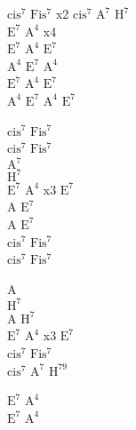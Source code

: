 \begin{chord}
    $\mathrm{cis^7}$ $\mathrm{Fis^7}$ x2 $\mathrm{cis^7}$ $\mathrm{A^7}$ $\mathrm{H^7}$\\
    $\mathrm{E^7}$ $\mathrm{A^4}$ x4\\
    $\mathrm{E^7}$ $\mathrm{A^4}$ $\mathrm{E^7}$\\
    $\mathrm{A^4}$ $\mathrm{E^7}$ $\mathrm{A^4}$\\
    $\mathrm{E^7}$ $\mathrm{A^4}$ $\mathrm{E^7}$\\
    $\mathrm{A^4}$ $\mathrm{E^7}$ $\mathrm{A^4}$ $\mathrm{E^7}$

    $\mathrm{cis^7}$ $\mathrm{Fis^7}$\\
    $\mathrm{cis^7}$ $\mathrm{Fis^7}$\\
    $\mathrm{A^7}$\\
    $\mathrm{H^7}$\\
    $\mathrm{E^7}$ $\mathrm{A^4}$ x3 $\mathrm{E^7}$\\
    A $\mathrm{E^7}$\\
    A $\mathrm{E^7}$\\
    $\mathrm{cis^7}$ $\mathrm{Fis^7}$\\
    $\mathrm{cis^7}$ $\mathrm{Fis^7}$

    A\\
    $\mathrm{H^7}$\\
    A $\mathrm{H^7}$\\
    $\mathrm{E^7}$ $\mathrm{A^4}$ x3 $\mathrm{E^7}$\\
    $\mathrm{cis^7}$ $\mathrm{Fis^7}$\\
    $\mathrm{cis^7}$ $\mathrm{A^7}$ $\mathrm{H^{7 9}}$

    $\mathrm{E^7}$ $\mathrm{A^4}$\\
    $\mathrm{E^7}$ $\mathrm{A^4}$
\end{chord}
